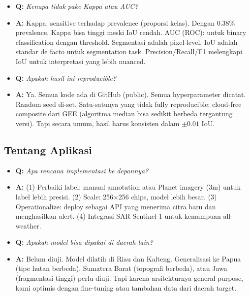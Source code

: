 \documentclass[10pt,a4paper,onecolumn]{article}
\begin{document}
\begin{itemize}
    \item{\textbf{Q:} \textit{Kenapa tidak pake Kappa atau AUC?}}
    \item{\textbf{A:} Kappa: sensitive terhadap prevalence (proporsi
          kelas). Dengan 0.38\% prevalence, Kappa bisa tinggi meski
          IoU rendah. AUC (ROC): untuk binary classification dengan
          threshold. Segmentasi adalah pixel-level, IoU adalah standar
          de facto untuk segmentation task. Precision/Recall/F1
          melengkapi IoU untuk interpretasi yang lebih nuanced.}
\end{itemize}

\begin{itemize}
    \item{\textbf{Q:} \textit{Apakah hasil ini reproducible?}}
    \item{\textbf{A:} Ya. Semua kode ada di GitHub (public). Semua
          hyperparameter dicatat. Random seed di-set. Satu-satunya
          yang tidak fully reproducible: cloud-free composite dari
          GEE (algoritma median bisa sedikit berbeda tergantung
          versi). Tapi secara umum, hasil harus konsisten dalam
          $\pm 0.01$ IoU.}
\end{itemize}

\subsection{Tentang Aplikasi}

\begin{itemize}
    \item{\textbf{Q:} \textit{Apa rencana implementasi ke depannya?}}
    \item{\textbf{A:} (1) Perbaiki label: manual annotation atau
          Planet imagery (3m) untuk label lebih presisi. (2) Scale:
          256$\times$256 chips, model lebih besar. (3) Operationalize:
          deploy sebagai API yang menerima citra baru dan menghasilkan
          alert. (4) Integrasi SAR Sentinel-1 untuk kemampuan
          all-weather.}
\end{itemize}

\begin{itemize}
    \item{\textbf{Q:} \textit{Apakah model bisa dipakai di daerah
          lain?}}
    \item{\textbf{A:} Belum diuji. Model dilatih di Riau dan Kalteng.
          Generalisasi ke Papua (tipe hutan berbeda), Sumatera Barat
          (topografi berbeda), atau Jawa (fragmentasi tinggi) perlu
          diuji. Tapi karena arsitekturnya general-purpose, kami
          optimis dengan fine-tuning atau tambahan data dari daerah
          target.}
\end{itemize}
\end{document}
